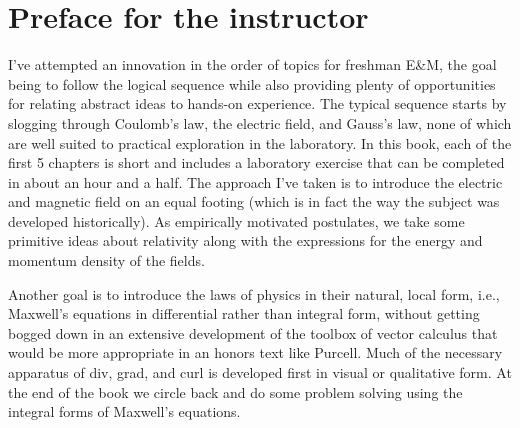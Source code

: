 \section*{Preface for the instructor}%
\label{instructor-preface}

I've attempted an innovation in the order of topics for freshman E\&M,
the goal being to follow the logical sequence while also providing
plenty of opportunities for relating abstract ideas to hands-on
experience. The typical sequence starts by slogging through Coulomb's
law, the electric field, and Gauss's law, none of which are well
suited to practical exploration in the laboratory. In this book, each of the 
first 5 chapters is short and includes a laboratory exercise that can
be completed in about an hour and a half. The approach I've taken is
to introduce the electric and magnetic field on an equal footing
(which is in fact the way the subject was developed historically). As
empirically motivated postulates, we take some primitive ideas about
relativity along with the expressions for the energy and momentum
density of the fields. 

Another goal is to introduce the laws of physics in their natural,
local form, i.e., Maxwell's equations in differential rather than
integral form, without getting bogged down in an extensive development
of the toolbox of vector calculus that would be more appropriate in an
honors text like Purcell. Much of the necessary apparatus of div,
grad, and curl is developed first in visual or qualitative form. At
the end of the book we circle back and do some problem solving using
the integral forms of Maxwell's equations. 
